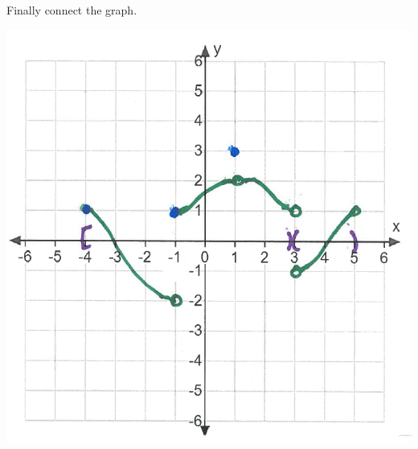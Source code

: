 \documentclass[nooutcomes]{ximera}
\begin{document}
\begin{problem}
\begin{freeResponse}
	Finally connect the graph.
	    \begin{image}
	\includegraphics[scale=.5]{"Sketching stage 4"}
	    \end{image}
	\end{freeResponse}
\end{problem}
	
	
	
	
\end{document}

